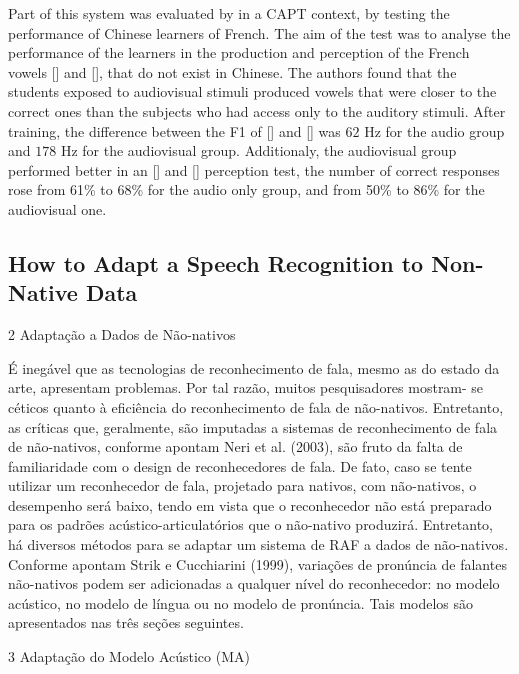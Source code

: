 Part of this system was evaluated by \citeauthor{Wang2014} \citep{Wang2014} in a \ac{CAPT} context, by testing the
performance of Chinese learners of French. The aim of the test was to analyse the performance of the learners in the production 
and perception of the French vowels [\textipa{\o}] and [\textipa{\oe}], that do not exist in Chinese. The authors found that the 
students exposed to audiovisual stimuli produced vowels that were closer to the correct ones than the subjects who had access only 
to the auditory stimuli. After training, the difference between the F1 of [\textipa{\o}] and [\textipa{\oe}] was $62$ Hz for the audio
group and $178$ Hz for the audiovisual group. Additionaly, the audiovisual group performed better in 
an [\textipa{\o}] and [\textipa{\oe}] perception test, the number of correct responses rose from 61\% to 68\% for the audio only
group, and from 50\% to 86\% for the audiovisual one.

\subsection{How to Adapt a Speech Recognition to Non-Native Data}

2 Adapta\c{c}\~ao a Dados de N\~ao-nativos

\'E ineg\'avel que as tecnologias de reconhecimento de fala, mesmo as do
estado da arte, apresentam problemas. Por tal raz\~ao, muitos
pesquisadores mostram- se c\'eticos quanto à efici\^encia do reconhecimento
de fala de n\~ao-nativos. Entretanto, as cr\'iticas que, geralmente, s\~ao
imputadas a sistemas de reconhecimento de fala de n\~ao-nativos, conforme
apontam Neri et al. (2003), s\~ao fruto da falta de familiaridade com o
design de reconhecedores de fala. De fato, caso se tente utilizar um
reconhecedor de fala, projetado para nativos, com n\~ao-nativos, o
desempenho ser\'a baixo, tendo em vista que o reconhecedor n\~ao est\'a
preparado para os padr\~oes ac\'ustico-articulat\'orios que o n\~ao-nativo
produzir\'a. Entretanto, h\'a diversos m\'etodos para se adaptar um sistema de
RAF a dados de n\~ao-nativos. Conforme apontam Strik e Cucchiarini (1999),
varia\c{c}\~oes de pron\'uncia de falantes n\~ao-nativos podem ser adicionadas a
qualquer n\'ivel do reconhecedor: no modelo ac\'ustico, no modelo de l\'ingua
ou no modelo de pron\'uncia. Tais modelos s\~ao apresentados nas tr\^es se\c{c}\~oes
seguintes.

3 Adapta\c{c}\~ao do Modelo Ac\'ustico (MA)


